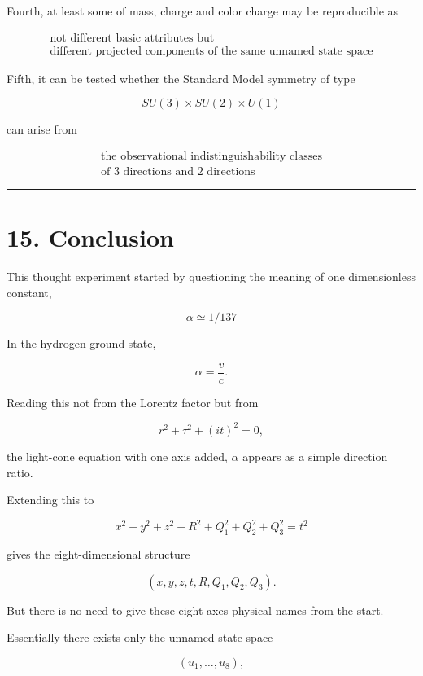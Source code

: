 \documentclass[
  a4paper,
]{article}
\begin{document}
Fourth, at least some of mass, charge and color charge may be
reproducible as

\[
\boxed{
\begin{array}{c}
\text{not different basic attributes but}\\
\text{different projected components of the same unnamed state space}
\end{array}
}
\]

Fifth, it can be tested whether the Standard Model symmetry of type

\[
SU(3)\times SU(2)\times U(1)
\]

can arise from

\[
\boxed{
\begin{array}{c}
\text{the observational indistinguishability classes}\\
\text{of 3 directions and 2 directions}
\end{array}
}
\]

\begin{center}\rule{0.5\linewidth}{0.5pt}\end{center}

\section{15. Conclusion}\label{conclusion}

This thought experiment started by questioning the meaning of one
dimensionless constant,

\[
\boxed{\alpha\simeq1/137}
\]

In the hydrogen ground state,

\[
\alpha=\frac vc.
\]

Reading this not from the Lorentz factor but from

\[
r^2+\tau^2+(it)^2=0 ,
\]

the light-cone equation with one axis added, \(\alpha\) appears as a
simple direction ratio.

Extending this to

\[
x^2+y^2+z^2+R^2+Q_1^2+Q_2^2+Q_3^2
=
t^2
\]

gives the eight-dimensional structure

\[
(x,y,z,t,R,Q_1,Q_2,Q_3).
\]

But there is no need to give these eight axes physical names from the
start.

Essentially there exists only the unnamed state space

\[
(u_1,\ldots,u_8),
\]
\end{document}
